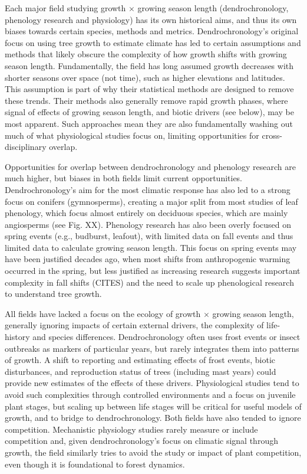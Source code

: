 \documentclass[11pt]{article}
\begin{document}
Each major field studying growth $\times$ growing season length (dendrochronology, phenology research and physiology) has its own historical aims, and thus its own biases towards certain species, methods and metrics. Dendrochronology's original focus on using tree growth to estimate climate has led to certain assumptions and methods that likely obscure the complexity of how growth shifts with growing season length. Fundamentally, the field has long assumed growth decreases with shorter seasons \citep[e.g.,][]{bruening2017} over space (not time), such as higher elevations and latitudes. This assumption is part of why their statistical methods are designed to remove these trends. Their methods also generally remove rapid growth phases, where signal of effects of growing season length, and biotic drivers (see below), may be most apparent. Such approaches mean they are also fundamentally washing out much of what physiological studies focus on, limiting opportunities for cross-disciplinary overlap. %

Opportunities for overlap between dendrochronology and phenology research are much higher, but biases in both fields limit current opportunities. Dendrochronology's aim for the most climatic response has also led to a strong focus on conifers (gymnosperms), creating a major split from most studies of leaf phenology, which focus almost entirely on deciduous species, which are mainly angiosperms (see Fig. XX). Phenology research has also been overly focused on spring events (e.g., budburst, leafout), with limited data on fall events and thus limited data to calculate growing season length. This focus on spring events may have been justified decades ago, when most shifts from anthropogenic warming occurred in the spring, but less justified as increasing research suggests important complexity in fall shifts (CITES) and the need to scale up phenological research to understand tree growth.

All fields have lacked a focus on the ecology of growth $\times$ growing season length, generally ignoring impacts of certain external drivers, the complexity of life-history and species differences. Dendrochronology often uses frost events or insect outbreaks as markers of particular years, but rarely integrates them into patterns of growth. A shift to reporting and estimating effects of frost events, biotic disturbances, and reproduction status of trees (including mast years) could provide new estimates of the effects of these drivers. Physiological studies tend to avoid such complexities through controlled environments and a focus on juvenile plant stages, but scaling up between life stages will be critical for useful models of growth, and to bridge to dendrochronology. Both fields have also tended to ignore competition. Mechanistic physiology studies rarely measure or include competition and, given dendrochronology's focus on climatic signal through growth, the field similarly tries to avoid the study or impact of plant competition, even though it is foundational to forest dynamics.
\end{document}
